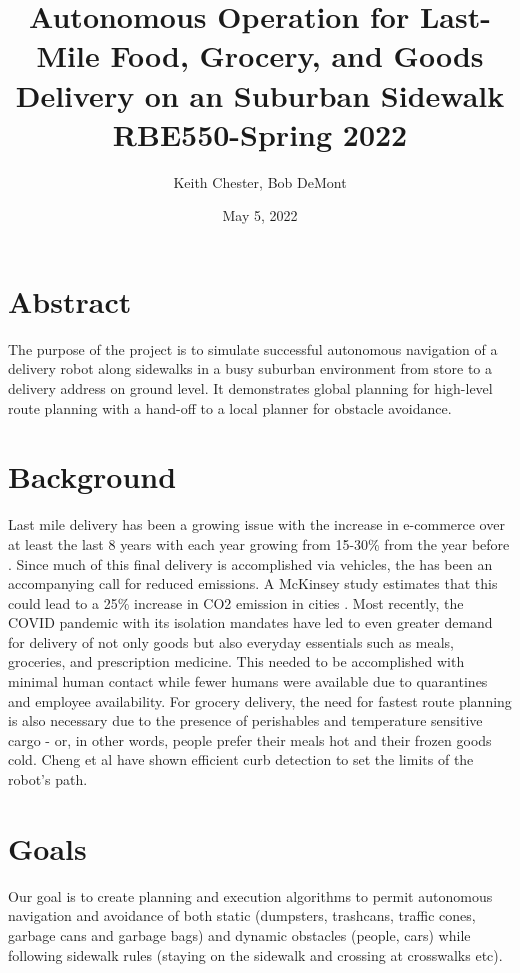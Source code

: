 \documentclass{article}
\title{Autonomous Operation for Last-Mile Food, Grocery, and Goods Delivery on an Suburban Sidewalk\\
\vspace{5mm}
\large RBE550-Spring 2022 }
\author{Keith Chester, Bob DeMont}
\date{May 5, 2022}
\begin{document}
\maketitle

\begin{multicols}{2}
\section*{Abstract}
The purpose of the project is to simulate successful autonomous navigation of a delivery robot along sidewalks in a busy suburban environment from store to a delivery address on ground level.  It demonstrates global planning for high-level route planning with a hand-off to a local planner for obstacle avoidance.

\section*{Background}
Last mile delivery has been a growing issue with the increase in e-commerce over at least the last 8 years with each year growing from 15-30\% from the year before \cite{Ecom}.  Since much of this final delivery is accomplished via vehicles, the has been an accompanying call for reduced emissions.  A McKinsey study estimates that this could lead to a 25\% increase in CO2 emission in cities \cite{Emiss}.  Most recently, the COVID pandemic with its isolation mandates have led to even greater demand for delivery of not only goods but also everyday essentials such as meals, groceries, and prescription medicine.  This needed to be accomplished with minimal human contact while fewer humans were available due to quarantines and employee availability.  For grocery delivery, the need for fastest route planning is also necessary due to the presence of perishables and temperature sensitive cargo - or, in other words, people prefer their meals hot and their frozen goods cold. Cheng et al \cite{Mcheng} have shown efficient curb detection to set the limits of the robot's path.

\section*{Goals}
Our goal is to create planning and execution algorithms to permit autonomous navigation and avoidance of both static (dumpsters, trashcans, traffic cones, garbage cans and garbage bags) and dynamic obstacles (people, cars) while following sidewalk rules (staying on the sidewalk and crossing at crosswalks etc).


\end{multicols}
\end{document}
